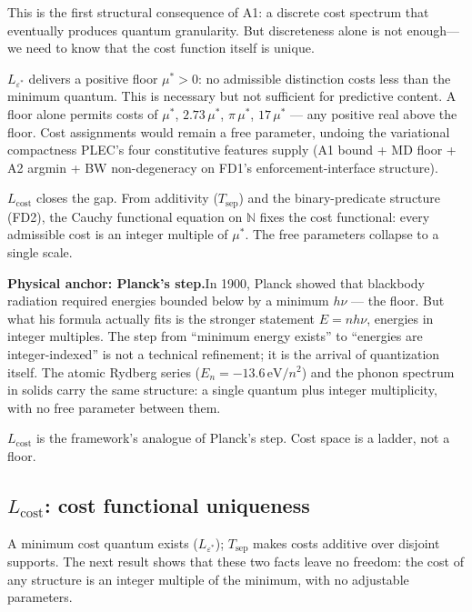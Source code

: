 \documentclass[11pt]{article}
\theoremstyle{remark}
\begin{document}
\smallskip\noindent This is the first structural consequence of A1: a discrete cost spectrum that eventually produces quantum granularity.  But discreteness alone is not enough---we need to know that the cost function itself is unique.

\begin{tcolorbox}[apfbox, title={From a floor to a ladder: why $L_{\varepsilon^*}$ needs $L_{\mathrm{cost}}$}]
$L_{\varepsilon^*}$ delivers a positive floor $\mu^* > 0$: no admissible distinction costs less than the minimum quantum.  This is necessary but not sufficient for predictive content.  A floor alone permits costs of $\mu^*$, $2.73\,\mu^*$, $\pi\,\mu^*$, $17\,\mu^*$ --- any positive real above the floor.  Cost assignments would remain a free parameter, undoing the variational compactness PLEC's four constitutive features supply (A1 bound + MD floor + A2 argmin + BW non-degeneracy on FD1's enforcement-interface structure).

\smallskip\noindent $L_{\mathrm{cost}}$ closes the gap.  From additivity ($T_{\mathrm{sep}}$) and the binary-predicate structure (FD2), the Cauchy functional equation on $\mathbb{N}$ fixes the cost functional: every admissible cost is an integer multiple of $\mu^*$.  The free parameters collapse to a single scale.

\smallskip\noindent\textbf{Physical anchor: Planck's step.}\quad In 1900, Planck showed that blackbody radiation required energies bounded below by a minimum $h\nu$ --- the floor.  But what his formula actually fits is the stronger statement $E = n h\nu$, energies in integer multiples.  The step from ``minimum energy exists'' to ``energies are integer-indexed'' is not a technical refinement; it is the arrival of quantization itself.  The atomic Rydberg series ($E_n = -13.6\,\mathrm{eV}/n^2$) and the phonon spectrum in solids carry the same structure: a single quantum plus integer multiplicity, with no free parameter between them.

\smallskip\noindent $L_{\mathrm{cost}}$ is the framework's analogue of Planck's step.  Cost space is a ladder, not a floor.
\end{tcolorbox}

\subsection{\texorpdfstring{$L_{\mathrm{cost}}$}{L cost}: cost functional uniqueness}
\label{sec:L_cost}\label{sec:L_map}

\noindent A minimum cost quantum exists ($L_{\varepsilon^*}$); $T_{\mathrm{sep}}$ makes costs additive over disjoint supports.  The next result shows that these two facts leave no freedom: the cost of any structure is an integer multiple of the minimum, with no adjustable parameters.
\end{document}
